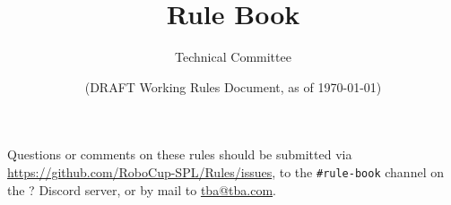 \documentclass[12pt]{article}
\title{\leaguename Rule Book}
\author{\leaguename Technical Committee}
\date{(DRAFT \RCYear Working Rules Document, as of \today)}
\begin{document}
\maketitle

\begin{center}
  Questions or comments on these rules should be submitted via \url{https://github.com/RoboCup-SPL/Rules/issues}, to the \texttt{\#rule-book} channel on the ? Discord server, or by mail to \url{tba@tba.com}.
\end{center}

\newpage

\tableofcontents
\setcounter{tocdepth}{3}

\thispagestyle{fancy}

\clearpage

\cfoot{\thepage}
\setcounter{page}{1}

\newpage


\newpage
\end{document}
